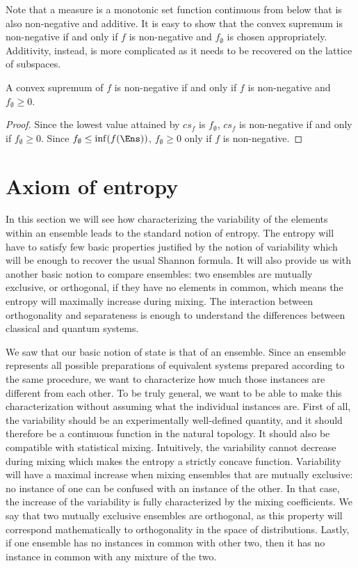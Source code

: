 Note that a measure is a monotonic set function continuous from below that is also non-negative and additive. It is easy to show that the convex supremum is non-negative if and only if $f$ is non-negative and $f_{\emptyset}$ is chosen appropriately. Additivity, instead, is more complicated as it needs to be recovered on the lattice of subspaces.

\begin{mathSection}
\begin{coro}
	A convex supremum of $f$ is non-negative if and only if $f$ is non-negative and $f_{\emptyset} \geq 0$.
\end{coro}
\begin{proof}
	Since the lowest value attained by $cs_f$ is $f_{\emptyset}$, $cs_f$ is non-negative if and only if $f_{\emptyset} \geq 0$. Since $f_{\emptyset} \leq \inf(f(\Ens))$, $f_{\emptyset} \geq 0$ only if $f$ is non-negative.
\end{proof}
\end{mathSection}

\section{Axiom of entropy}

In this section we will see how characterizing the variability of the elements within an ensemble leads to the standard notion of entropy. The entropy will have to satisfy few basic properties justified by the notion of variability which will be enough to recover the usual Shannon formula. It will also provide us with another basic notion to compare ensembles: two ensembles are mutually exclusive, or orthogonal, if they have no elements in common, which means the entropy will maximally increase during mixing. The interaction between orthogonality and separateness is enough to understand the differences between classical and quantum systems.

We saw that our basic notion of state is that of an ensemble. Since an ensemble represents all possible preparations of equivalent systems prepared according to the same procedure, we want to characterize how much those instances are different from each other. To be truly general, we want to be able to make this characterization without assuming what the individual instances are. First of all, the variability should be an experimentally well-defined quantity, and it should therefore be a continuous function in the natural topology. It should also be compatible with statistical mixing. Intuitively, the variability cannot decrease during mixing which makes the entropy a strictly concave function. Variability will have a maximal increase when mixing ensembles that are mutually exclusive: no instance of one can be confused with an instance of the other. In that case, the increase of the variability is fully characterized by the mixing coefficients. We say that two mutually exclusive ensembles are orthogonal, as this property will correspond mathematically to orthogonality in the space of distributions. Lastly, if one ensemble has no instances in common with other two, then it has no instance in common with any mixture of the two.

